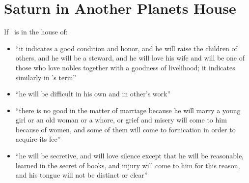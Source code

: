 \section{Saturn in Another Planets House}
If \Saturn\, is in the house of:
\begin{itemize}[topsep=0em,itemsep=0em]
\item[\Jupiter] ``it indicates a good condition and honor, and he will raise the children of others, and he will be a steward, and he will love his wife and will be one of those who love nobles together with a goodness of livelihood; it indicates similarly in \Jupiter's term''

\item[\Mars] ``he will be difficult in his own and in other's work''

\item[\Venus] ``there is no good in the matter of marriage because he will marry a young girl or an old woman or a whore, or grief and misery will come to him because of women, and some of them will come to fornication in order to acquire its fee''

\item[\Mercury] ``he will be secretive, and will love silence except that he will be reasonable, learned in the secret of books, and injury will come to him for this reason, and his tongue will not be distinct or clear''


\end{itemize}